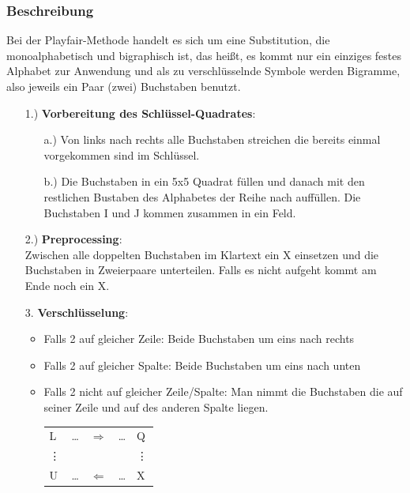 \documentclass[landscape,twocolumn,a4paper]{article}
\newcommand{\Ra}{\Rightarrow}
\newcommand{\La}{\Leftarrow}
\begin{document}
\subsubsection{Beschreibung}
Bei der Playfair-Methode handelt es sich um eine Substitution, die monoalphabetisch und bigraphisch ist, das heißt, es kommt nur ein einziges  festes Alphabet zur Anwendung und als zu verschlüsselnde Symbole werden Bigramme, also jeweils ein Paar (zwei) Buchstaben benutzt.
\begin{itemize}
	\item[1.)] \textbf{Vorbereitung des Schlüssel-Quadrates}:
		\begin{itemize}
			\item[a.)] Von links nach rechts alle Buchstaben streichen die bereits einmal vorgekommen sind im Schlüssel.
			\item[b.)] Die Buchstaben in ein 5x5 Quadrat füllen und danach mit den restlichen Bustaben des Alphabetes der Reihe nach auffüllen. Die Buchstaben I und J kommen zusammen in ein Feld.
		\end{itemize}
	\item[2.)] \textbf{Preprocessing}: \\
		Zwischen alle doppelten Buchstaben im Klartext ein X einsetzen und die Buchstaben in Zweierpaare unterteilen. Falls es nicht aufgeht kommt am Ende noch ein X.
	\item[3.] \textbf{Verschlüsselung}:
		\begin{itemize}
 			\item Falls 2 auf gleicher Zeile: Beide Buchstaben um eins nach rechts
			\item Falls 2 auf gleicher Spalte: Beide Buchstaben um eins nach unten
			\item Falls 2 nicht auf gleicher Zeile/Spalte: Man nimmt die Buchstaben die auf seiner Zeile und auf des anderen Spalte liegen.\\
				\begin{tabular}{lllll}
  					L&\dots&$\Ra$&\dots&Q\\
					\vdots &&&&\vdots\\
  					U&\dots&$\La$&\dots&X\\
				\end{tabular}
		\end{itemize}
\end{itemize}
\end{document}

